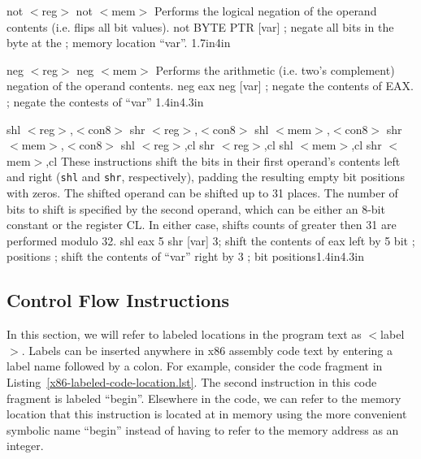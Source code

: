{not $<$reg$>$ \newline not $<$mem$>$}
{Performs the logical negation of the operand contents (i.e. flips all bit values).}
{not BYTE PTR [var]}
{; negate all bits in the byte at the \newline ; memory location ``var''.}
{1.7in}{4in}

{neg $<$reg$>$ \newline neg $<$mem$>$}
{Performs the arithmetic (i.e. two's complement) negation of the operand contents.}
{neg eax \newline neg [var]}
{; negate the contents of EAX. \newline ; negate the contests of ``var''}
{1.4in}{4.3in}

{shl $<$reg$>$,$<$con8$>$ \hspace{0.5in} shr $<$reg$>$,$<$con8$>$\newline
shl $<$mem$>$,$<$con8$>$ \hspace{0.5in} shr $<$mem$>$,$<$con8$>$\newline
shl $<$reg$>$,cl \hspace{0.92in} shr $<$reg$>$,cl\newline
shl $<$mem$>$,cl \hspace{0.92in} shr $<$mem$>$,cl}
{These instructions shift the bits in their first operand's contents
  left and right ({\tt shl} and {\tt shr}, respectively), padding the
  resulting empty bit positions with zeros. The shifted operand can be
  shifted up to 31 places. The number of bits to shift is specified
  by the second operand, which can be either an 8-bit constant or the
  register CL. In either case, shifts counts of greater then 31 are
  performed modulo 32.}
{shl eax 5 \newline\newline shr [var] 3}{; shift the contents of eax left by 5 bit \newline ; positions \newline ; shift the contents of ``var'' right by 3 \newline ; bit positions}{1.4in}{4.3in}

\subsection{Control Flow Instructions}

In this section, we will refer to labeled locations in the program
text as $<$label$>$. Labels can be inserted anywhere in x86 assembly
code text by entering a label name followed by a colon. For example,
consider the code fragment in Listing~\ref{x86-labeled-code-location.lst}.
The second instruction in this code fragment is labeled ``begin''.
Elsewhere in the code, we can refer to the memory location that this
instruction is located at in memory using the more convenient symbolic
name ``begin'' instead of having to refer to the memory address as an
integer.

